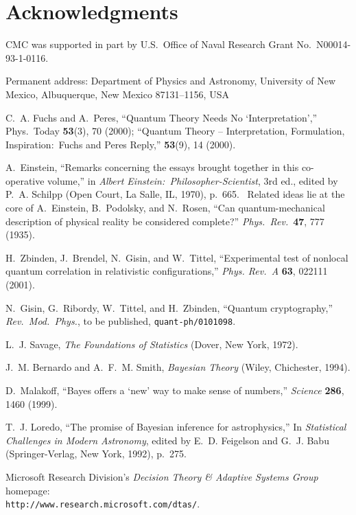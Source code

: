 \section{Acknowledgments}

CMC was supported in part by U.S.\ Office of Naval Research Grant
No.~N00014-93-1-0116.

\begin{thebibliography}{99}

Permanent address: Department of Physics and Astronomy, University of
New Mexico, Albuquerque, New Mexico 87131--1156, USA

C.~A. Fuchs and A.~Peres, ``Quantum Theory Needs No
`Interpretation','' Phys.\ Today {\bf 53}(3), 70 (2000); ``Quantum
Theory -- Interpretation, Formulation, Inspiration:\ Fuchs and Peres
Reply,'' {\bf 53}(9), 14 (2000).

A.~Einstein, ``Remarks concerning the essays brought together in this
co-operative volume,'' in {\it Albert Einstein:\
Philosopher-Scientist}, 3rd ed., edited by P.~A. Schilpp (Open Court,
La Salle, IL, 1970), p.~665. \ Related ideas lie at the core of
A.~Einstein, B.~Podolsky, and N.~Rosen, ``Can quantum-mechanical
description of physical reality be considered complete?'' {\it Phys.\
Rev.}\ {\bf 47}, 777 (1935).

H.~Zbinden, J.~Brendel, N.~Gisin, and W.~Tittel, ``Experimental test
of nonlocal quantum correlation in relativistic configurations,''
{\it Phys. Rev.~A\/} {\bf 63}, 022111 (2001).

N.~Gisin, G.~Ribordy, W.~Tittel, and H.~Zbinden, ``Quantum cryptography,''
{\it Rev.\ Mod.\ Phys.}, to be published, {\tt quant-ph/0101098}.

\bibitem{Savage72}
L.~J. Savage, {\it The Foundations of Statistics\/} (Dover, New York,
1972).

J.~M. Bernardo and A.~F.~M. Smith, {\it Bayesian Theory\/} (Wiley,
Chichester, 1994).

D.~Malakoff, ``Bayes offers a `new' way to make sense of numbers,''
{\it Science\/} {\bf 286}, 1460 (1999).

T.~J. Loredo, ``The promise of Bayesian inference for astrophysics,''
In {\it Statistical Challenges in Modern Astronomy}, edited by E.~D.
Feigelson and G.~J. Babu (Springer-Verlag, New York, 1992), p.~275.

\bibitem{Microsoft}
Microsoft Research Division's {\it Decision Theory \& Adaptive
Systems Group\/} home\-page: \\
{\tt http://www.research.microsoft.com/dtas/}.


\end{thebibliography}

